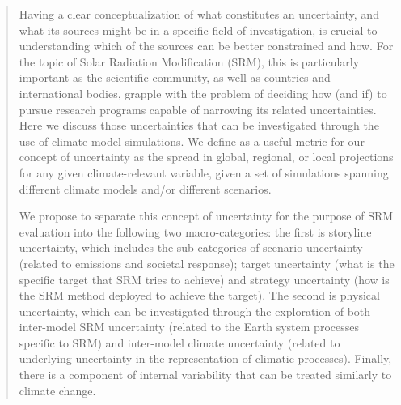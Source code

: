 \documentclass[acp, manuscript]{copernicus}
\begin{document}
\begin{abstract}
Having a clear conceptualization of what constitutes an uncertainty, and what its sources might be in a specific field of investigation, is crucial to understanding which of the sources can be better constrained and how. For the topic of Solar Radiation Modification (SRM), this is particularly important as the scientific community, as well as countries and international bodies, grapple with the problem of deciding how (and if) to pursue research programs capable of narrowing its related uncertainties.
Here we discuss those uncertainties that can be investigated through the use of climate model simulations. We define as a useful metric for our concept of uncertainty as the spread in global, regional, or local projections for any given climate-relevant variable, given a set of simulations spanning different climate models and/or different scenarios.

We propose to separate this concept of uncertainty for the purpose of SRM evaluation into the following two macro-categories: the first is storyline uncertainty, which includes the sub-categories of scenario uncertainty (related to emissions and societal response); target uncertainty (what is the specific target that SRM tries to achieve) and strategy uncertainty (how is the SRM method deployed to achieve the target). The second is physical uncertainty, which can be investigated through the exploration of both inter-model SRM uncertainty (related to the Earth system processes specific to SRM) and inter-model climate uncertainty (related to underlying uncertainty in the representation of climatic processes). Finally, there is a component of internal variability that can be treated similarly to climate change.


\end{abstract}
\end{document}
